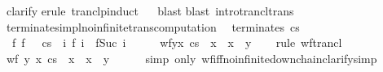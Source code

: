 \begin{isabellebody}
\ clarify\isanewline
{}\isamarkupfalse%
{\isacharparenleft}erule\ tranclp{\isacharunderscore}induct{\isacharparenright}\isanewline
\ \isamarkupfalse%
\ blast\isanewline
{}\isamarkupfalse%
{\isacharparenleft}blast\ intro{\isacharcolon}trancl{\isacharunderscore}trans{\isacharparenright}\isanewline
{}\isamarkupfalse%
%
\endisatagproof
{\isafoldproof}%
%
\isadelimproof
\isanewline
%
\endisadelimproof
\isanewline
{}\isamarkupfalse%
\ terminates{\isacharunderscore}impl{\isacharunderscore}no{\isacharunderscore}infinite{\isacharunderscore}trans{\isacharunderscore}computation{\isacharcolon}\isanewline
\ \ terminates{\isacharcolon}\ {\isachardoublequoteopen}{\isasymGamma}{\isasymturnstile}c{\isasymdown}s{\isachardoublequoteclose}\isanewline
\ \ {\isachardoublequoteopen}{\isasymnot}{\isacharparenleft}{\isasymexists}f{\isachardot}\ f\ {}\ {\isacharequal}\ {\isacharparenleft}c{\isacharcomma}s{\isacharparenright}\ {\isasymand}\ {\isacharparenleft}{\isasymforall}i{\isachardot}\ {\isasymGamma}{\isasymturnstile}f\ i\ {\isasymrightarrow}\isactrlsup {\isacharplus}\ f{\isacharparenleft}Suc\ i{\isacharparenright}{\isacharparenright}{\isacharparenright}{\isachardoublequoteclose}\isanewline
%
\isadelimproof
%
\endisadelimproof
%
\isatagproof
{}\isamarkupfalse%
\ {\isacharminus}\isanewline
\ \ \isamarkupfalse%
\ {\isachardoublequoteopen}wf{\isacharparenleft}{\isacharbraceleft}{\isacharparenleft}y{\isacharcomma}x{\isacharparenright}{\isachardot}\ {\isasymGamma}{\isasymturnstile}{\isacharparenleft}c{\isacharcomma}s{\isacharparenright}\ {\isasymrightarrow}\isactrlsup {\isacharasterisk}\ x\ {\isasymand}\ {\isasymGamma}{\isasymturnstile}x\ {\isasymrightarrow}\ y{\isacharbraceright}\isactrlsup {\isacharplus}{\isacharparenright}{\isachardoublequoteclose}\isanewline
\ \ \isamarkupfalse%
\ {\isacharparenleft}rule\ wf{\isacharunderscore}trancl{\isacharparenright}\isanewline
\ \ \ \ \isamarkupfalse%
\ {\isachardoublequoteopen}wf\ {\isacharbraceleft}{\isacharparenleft}y{\isacharcomma}\ x{\isacharparenright}{\isachardot}\ {\isasymGamma}{\isasymturnstile}{\isacharparenleft}c{\isacharcomma}s{\isacharparenright}\ {\isasymrightarrow}\isactrlsup {\isacharasterisk}\ x\ {\isasymand}\ {\isasymGamma}{\isasymturnstile}x\ {\isasymrightarrow}\ y{\isacharbraceright}{\isachardoublequoteclose}\isanewline
\ \ \ \ \isamarkupfalse%
\ {\isacharparenleft}simp\ only{\isacharcolon}\ wf{\isacharunderscore}iff{\isacharunderscore}no{\isacharunderscore}infinite{\isacharunderscore}down{\isacharunderscore}chain{\isacharcomma}clarify{\isacharcomma}simp{\isacharparenright}\isanewline

\end{isabellebody}
